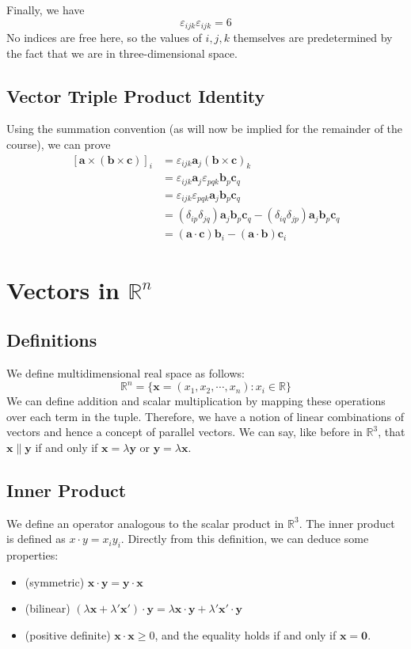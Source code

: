 \documentclass{article}
\begin{document}
	Finally, we have
	\[ \varepsilon_{ijk}\varepsilon_{ijk} = 6 \]
	No indices are free here, so the values of $i, j, k$ themselves are predetermined by the fact that we are in three-dimensional space.
	
	\subsection{Vector Triple Product Identity}
	Using the summation convention (as will now be implied for the remainder of the course), we can prove
	\begin{align*}
		\left[ \bm a \times (\bm b \times \bm c) \right]_i
		&= \varepsilon_{ijk} \bm a_j (\bm b \times \bm c)_k \\
		&= \varepsilon_{ijk} \bm a_j \varepsilon_{pqk} \bm b_p \bm c_q \\
		&= \varepsilon_{ijk}\varepsilon_{pqk} \bm a_j \bm b_p \bm c_q \\
		&= (\delta_{ip}\delta_{jq})\bm a_j \bm b_p \bm c_q - (\delta_{iq}\delta_{jp})\bm a_j \bm b_p \bm c_q \\
		&= (\bm a \cdot \bm c) \bm b_i - (\bm a \cdot \bm b) \bm c_i
	\end{align*}

	\section{Vectors in $\mathbb R^n$}
	\subsection{Definitions}
	We define multidimensional real space as follows:
	\[ \mathbb R^n = \{ \bm x = (x_1, x_2, \cdots, x_n) : x_i \in \mathbb R \} \]
	We can define addition and scalar multiplication by mapping these operations over each term in the tuple. Therefore, we have a notion of linear combinations of vectors and hence a concept of parallel vectors. We can say, like before in $\mathbb R^3$, that $\bm x \parallel \bm y$ if and only if $\bm x = \lambda \bm y$ or $\bm y = \lambda \bm x$.
	
	\subsection{Inner Product}
	We define an operator analogous to the scalar product in $\mathbb R^3$. The inner product is defined as $x \cdot y = x_i y_i$. Directly from this definition, we can deduce some properties:
	\begin{itemize}
		\item (symmetric) $\bm x \cdot \bm y = \bm y \cdot \bm x$
		\item (bilinear) $(\lambda \bm x + \lambda'\bm x')\cdot \bm y = \lambda \bm x\cdot \bm y + \lambda' \bm x' \cdot \bm y$
		\item (positive definite) $\bm x \cdot \bm x \geq 0$, and the equality holds if and only if $\bm x = \bm 0$.
	\end{itemize}
\end{document}
